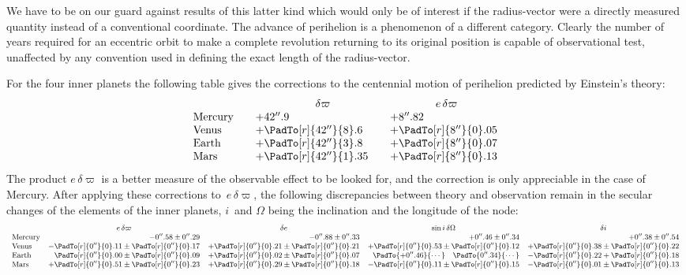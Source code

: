 \documentclass[12pt]{book}
\begin{document}
We have to be on our guard against results of this latter kind which would
only be of interest if the radius-vector were a directly measured quantity instead
of a conventional coordinate. The advance of perihelion is a phenomenon
of a different category. Clearly the number of years required for an eccentric
orbit to make a complete revolution returning to its original position is capable
of observational test, unaffected by any convention used in defining the exact
length of the radius-vector.

For the four inner planets the following table gives the corrections to the
%
%
centennial motion of perihelion predicted by Einstein's theory:
\[
\begin{array}{l@{\qquad}l@{\qquad}l}
  & \multicolumn{1}{c}{\delta\varpi} & \multicolumn{1}{c}{e\, \delta\varpi} \\
\text{Mercury} & +42''.9 & +8''.82 \\
\text{Venus} & +\PadTo[r]{42''}{8}.6 & +\PadTo[r]{8''}{0}.05 \\
\text{Earth} & +\PadTo[r]{42''}{3}.8 & +\PadTo[r]{8''}{0}.07 \\
\text{Mars}  & +\PadTo[r]{42''}{1}.35& +\PadTo[r]{8''}{0}.13 \\
\end{array}
\]
The product $e\, \delta\varpi$ is a better measure of the observable effect to be looked for,
and the correction is only appreciable in the case of Mercury. After applying
these corrections to~$e\, \delta\varpi$, the following discrepancies between theory and observation
remain in the secular changes of the elements of the inner planets,
$i$~and $\Omega$ being the inclination and the longitude of the node:
\[
\small
\begin{array}{lrrrr}
  & \multicolumn{1}{c}{e\, \delta\varpi} & \multicolumn{1}{c}{\delta e} & \multicolumn{1}{c}{\sin i\, \delta\Omega} & \multicolumn{1}{c}{\delta i} \\
  \text{Mercury} &
  -0''.58 \pm 0''.29 & -0''.88 \pm 0''.33 & +0''.46 \pm 0''.34 & +0''.38 \pm 0''.54 \\
  \text{Venus}   &
  -\PadTo[r]{0''}{0}.11 \pm \PadTo[r]{0''}{0}.17 & +\PadTo[r]{0''}{0}.21 \pm \PadTo[r]{0''}{0}.21 & +\PadTo[r]{0''}{0}.53 \pm \PadTo[r]{0''}{0}.12 & + \PadTo[r]{0''}{0}.38 \pm \PadTo[r]{0''}{0}.22 \\
  \text{Earth}   & \PadTo[r]{0''}{0}.00 \pm \PadTo[r]{0''}{0}.09 & +\PadTo[r]{0''}{0}.02 \pm \PadTo[r]{0''}{0}.07 & \PadTo{+0''.46}{\cdots} \quad \PadTo{0''.34}{\cdots} & -\PadTo[r]{0''}{0}.22 + \PadTo[r]{0''}{0}.18 \\
  \text{Mars}    & +\PadTo[r]{0''}{0}.51 \pm \PadTo[r]{0''}{0}.23 & +\PadTo[r]{0''}{0}.29 \pm \PadTo[r]{0''}{0}.18 & -\PadTo[r]{0''}{0}.11 \pm \PadTo[r]{0''}{0}.15 & -\PadTo[r]{0''}{0}.01 \pm \PadTo[r]{0''}{0}.13 \\
\end{array}
\]
\end{document}
